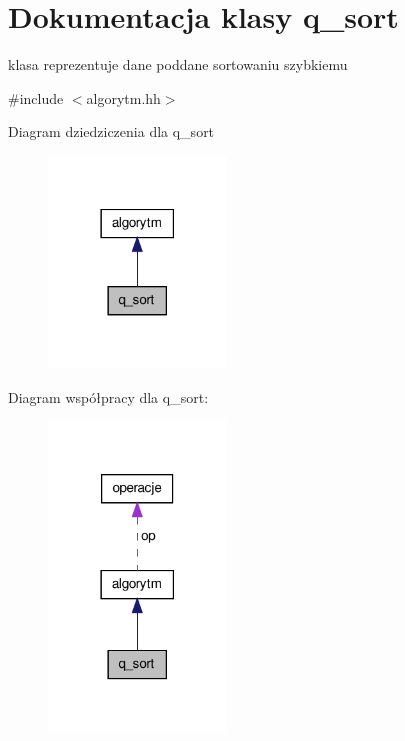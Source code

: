 \hypertarget{classq__sort}{\section{\-Dokumentacja klasy q\-\_\-sort}
\label{classq__sort}
}


klasa reprezentuje dane poddane sortowaniu szybkiemu  




{\ttfamily \#include $<$algorytm.\-hh$>$}



\-Diagram dziedziczenia dla q\-\_\-sort\nopagebreak
\begin{figure}[H]
\begin{center}
\leavevmode
\includegraphics[width=134pt]{classq__sort__inherit__graph}
\end{center}
\end{figure}


\-Diagram współpracy dla q\-\_\-sort\-:\nopagebreak
\begin{figure}[H]
\begin{center}
\leavevmode
\includegraphics[width=134pt]{classq__sort__coll__graph}
\end{center}
\end{figure}
